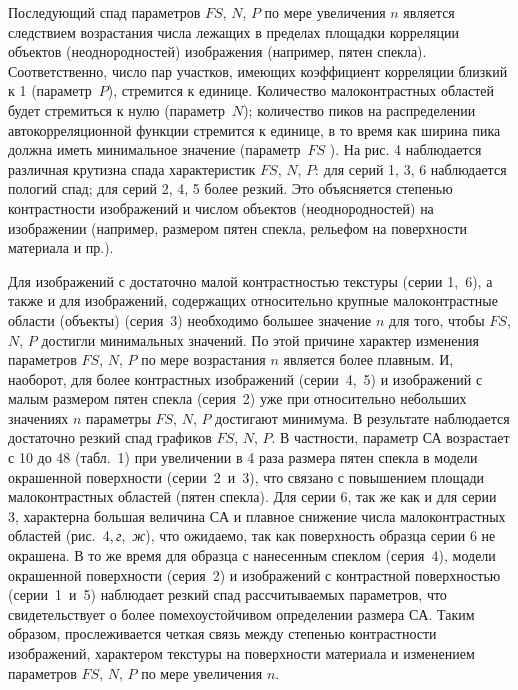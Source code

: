 \documentclass[a4paper]{jctart10}
\begin{document}
Последующий спад параметров $FS$, $N$, $P$ по мере увеличения $n$ является следствием возрастания числа лежащих в пределах площадки корреляции объектов (неоднородностей) изображения (например, пятен спекла). Соответственно, число пар участков, имеющих коэффициент корреляции близкий к 1 (параметр~$P$), стремится к единице. Количество малоконтрастных областей будет стремиться к нулю (параметр~$N$); количество пиков на распределении автокорреляционной функции стремится к единице, в то время как ширина пика должна иметь минимальное значение (параметр~$FS$ ). На рис. 4 наблюдается различная крутизна спада характеристик $FS$, $N$, $P$: для серий 1, 3, 6 наблюдается пологий спад; для серий 2, 4, 5 более резкий. Это объясняется степенью контрастности изображений и числом объектов (неоднородностей) на изображении (например, размером пятен спекла, рельефом на поверхности материала и пр.).

Для изображений с достаточно малой контрастностью текстуры (серии 1,~6), а также и для изображений, содержащих относительно крупные малоконтрастные области (объекты) (серия~3) необходимо большее значение $n$ для того, чтобы $FS$, $N$, $P$ достигли минимальных значений. По этой причине характер изменения параметров $FS$, $N$, $P$ по мере возрастания $n$ является более плавным. И, наоборот, для более контрастных изображений (серии~4,~5) и изображений с малым размером пятен спекла (серия~2) уже при относительно небольших значениях $n$ параметры $FS$, $N$, $P$ достигают минимума. В результате наблюдается достаточно резкий спад графиков $FS$, $N$, $P$. В частности, параметр СА возрастает с 10 до 48 (табл.~1) при увеличении в 4 раза размера пятен спекла в модели окрашенной поверхности (серии~2~и~3), что связано с повышением площади малоконтрастных областей (пятен спекла). Для серии 6, так же как и для серии 3, характерна большая величина $СА$ и плавное снижение числа малоконтрастных областей (рис.~4,\,{\it г},~{\it ж}), что ожидаемо, так как поверхность образца серии 6 не окрашена. В то же время для образца с нанесенным спеклом (серия~4), модели окрашенной поверхности (серия~2) и изображений с контрастной поверхностью (серии~1~и~5) наблюдает резкий спад рассчитываемых параметров, что свидетельствует о более помехоустойчивом определении размера $СА$. Таким образом, прослеживается четкая связь между степенью контрастности изображений, характером текстуры на поверхности материала и изменением параметров $FS$, $N$, $P$ по мере увеличения $n$.
\end{document}
